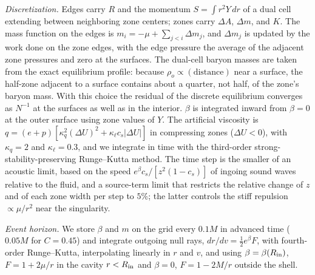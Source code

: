 \documentclass[%
 reprint,
 amsmath,amssymb,
 aps,prd,
 superscriptaddress,
]{revtex4-2}
\begin{document}
\emph{Discretization.} Edges carry $R$ and the momentum $S=\int r^2Y\,dr$ of a dual cell extending between neighboring zone centers; zones carry $\Delta A$, $\Delta m$, and $K$. The mass function on the edges is $m_i=-\mu+\sum_{j<i}\Delta m_j$, and $\Delta m_j$ is updated by the work done on the zone edges, with the edge pressure the average of the adjacent zone pressures and zero at the surfaces. The dual-cell baryon masses are taken from the exact equilibrium profile: because $\rho_o\propto(\text{distance})$ near a surface, the half-zone adjacent to a surface contains about a quarter, not half, of the zone's baryon mass. With this choice the residual of the discrete equilibrium converges as $N^{-1}$ at the surfaces as well as in the interior. $\beta$ is integrated inward from $\beta=0$ at the outer surface using zone values of $Y$. The artificial viscosity is $q=(e+p)\left[\kappa_q^2(\Delta U)^2+\kappa_\ell c_s|\Delta U|\right]$ in compressing zones ($\Delta U<0$), with $\kappa_q=2$ and $\kappa_\ell=0.3$, and we integrate in time with the third-order strong-stability-preserving Runge--Kutta method. The time step is the smaller of an acoustic limit, based on the speed $e^\beta c_s/[z^2(1-c_s)]$ of ingoing sound waves relative to the fluid, and a source-term limit that restricts the relative change of $z$ and of each zone width per step to $5\%$; the latter controls the stiff repulsion $\propto\mu/r^2$ near the singularity.

\emph{Event horizon.} We store $\beta$ and $m$ on the grid every $0.1M$ in advanced time ($0.05M$ for $C=0.45$) and integrate outgoing null rays, $dr/dv=\frac{1}{2}e^\beta F$, with fourth-order Runge--Kutta, interpolating linearly in $r$ and $v$, and using $\beta=\beta(R_{\rm in})$, $F=1+2\mu/r$ in the cavity $r<R_{\rm in}$ and $\beta=0$, $F=1-2M/r$ outside the shell.





\end{document}
